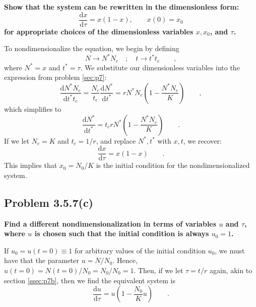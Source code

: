\documentclass[draft]{agujournal2019}
\begin{document}
\textbf{Show that the system can be rewritten in the dimensionless form:
\begin{equation*}
    \frac{\mathrm{d}x}{\mathrm{d}\tau}= x(1-x), \qquad x(0) = x_0 
\end{equation*}
for appropriate choices of the dimensionless variables $x,x_0$, and $\tau$.}

To nondimensionalize the equation, we begin by defining
\begin{equation*}
    N\longrightarrow N^* N_c \quad ; \quad t \longrightarrow t^* t_c \qquad ,
\end{equation*}
where $N^*=x$ and $t^*=\tau$. We substitute our dimensionless variables into the expression from problem \ref{sec:p7}:
\begin{equation*}
    \frac{\mathrm{d}N^* N_c}{\mathrm{d}t^*t_c} = \frac{N_c}{t_c} \frac{\mathrm{d}N^* }{\mathrm{d}t^*} = r N^* N_c \left(1 - \frac{N^*N_c}{K}\right) \qquad ,
\end{equation*}
which simplifies to
\begin{equation*}
     \frac{\mathrm{d}N^* }{\mathrm{d}t^*} = t_c r N^*  \left(1 - \frac{N^*N_c}{K}\right) \qquad .
\end{equation*}
If we let $N_c = K$ and $t_c = 1/r$, and replace $N^*,t^*$ with $x,t$, we recover:
\begin{equation*}
    \frac{\mathrm{d}x }{\mathrm{d}\tau} = x(1-x) \qquad .
\end{equation*}
This implies that $x_0=N_0/K$ is the initial condition for the nondimensionalized system.

\subsection{Problem 3.5.7(c)}
\label{ssec:p7c}

\textbf{Find a different nondimensionalization in terms of variables $u$ and $\tau$, where $u$ is chosen such that the initial condition is always $u_0=1$.}

If $u_0=u(t=0)\equiv1$ for arbitrary values of the initial condition $u_0$, we must have that the parameter $u=N/N_0$. Hence, $u(t=0) = N(t=0)/N_0 = N_0/N_0 = 1$. Then, if we let $\tau=t/r$ again, akin to section \ref{ssec:p7b}, then we find the equivalent system is
\begin{equation*}
    \frac{\mathrm{d}u}{\mathrm{d}\tau} = u\left(1-\frac{N_0}{K}u\right) \qquad .
\end{equation*}
\end{document}
